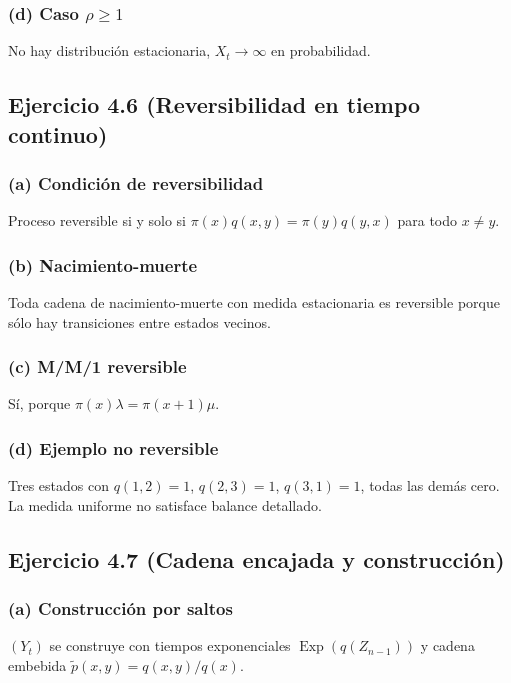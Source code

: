 \documentclass[letterpaper, 12pt]{article}
\newcommand{\1}{\mathbbm{1}}
\DeclareMathOperator{\Exp}{Exp}
\begin{document}
    \subsubsection*{(d) Caso $\rho\ge1$}
    No hay distribuci\'on estacionaria, $X_t\to\infty$ en probabilidad.

    \subsection{Ejercicio 4.6 (Reversibilidad en tiempo continuo)}

    \subsubsection*{(a) Condici\'on de reversibilidad}
    Proceso reversible si y solo si $\pi(x)q(x,y)=\pi(y)q(y,x)$ para todo $x\neq y$.

    \subsubsection*{(b) Nacimiento-muerte}
    Toda cadena de nacimiento-muerte con medida estacionaria es reversible porque s\'olo hay transiciones entre estados vecinos.

    \subsubsection*{(c) M/M/1 reversible}
    S\'i, porque $\pi(x)\lambda=\pi(x+1)\mu$.

    \subsubsection*{(d) Ejemplo no reversible}
    Tres estados con $q(1,2)=1$, $q(2,3)=1$, $q(3,1)=1$, todas las dem\'as cero. La medida uniforme no satisface balance detallado.

    \subsection{Ejercicio 4.7 (Cadena encajada y construcci\'on)}

    \subsubsection*{(a) Construcci\'on por saltos}
    $(Y_t)$ se construye con tiempos exponenciales $\Exp(q(Z_{n-1}))$ y cadena embebida $\tilde p(x,y)=q(x,y)/q(x)$.
\end{document}
